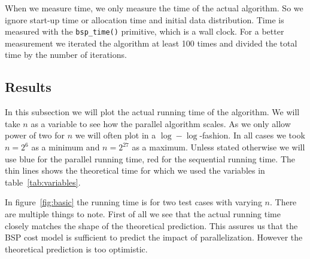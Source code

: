 When we measure time, we only measure the time of the actual algorithm. So we ignore start-up time or allocation time and initial data distribution. Time is measured with the \texttt{bsp\_time()} primitive, which is a wall clock. For a better measurement we iterated the algorithm at least 100 times and divided the total time by the number of iterations.

\subsection{Results}
In this subsection we will plot the actual running time of the algorithm. We will take $n$ as a variable to see how the parallel algorithm scales. As we only allow power of two for $n$ we will often plot in a $\log-\log$-fashion. In all cases we took $n=2^6$ as a minimum and $n=2^{27}$ as a maximum. Unless stated otherwise we will use blue for the parallel running time, red for the sequential running time. The thin lines shows the theoretical time for which we used the variables in table~\ref{tab:variables}.

In figure~\ref{fig:basic} the running time is for two test cases with varying $n$. There are multiple things to note. First of all we see that the actual running time closely matches the shape of the theoretical prediction. This assures us that the BSP cost model is sufficient to predict the impact of parallelization. However the theoretical prediction is too optimistic.

